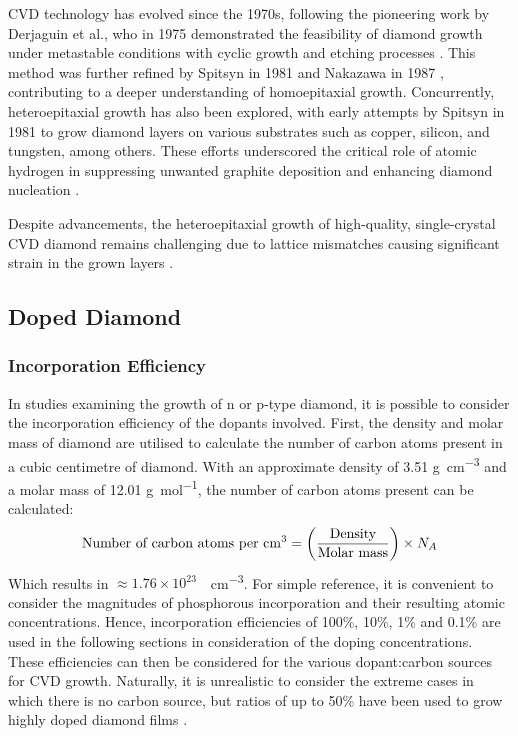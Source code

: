 \begin{refsection}
CVD technology has evolved since the 1970s, following the pioneering work by Derjaguin et al., who in 1975 demonstrated the feasibility of diamond growth under metastable conditions with cyclic growth and etching processes \cite{derjaguin:1975}. This method was further refined by Spitsyn in 1981 \cite{spitsyn:1981} and Nakazawa in 1987 \cite{nakazawa:1987}, contributing to a deeper understanding of homoepitaxial growth. Concurrently, heteroepitaxial growth has also been explored, with early attempts by Spitsyn in 1981 to grow diamond layers on various substrates such as copper, silicon, and tungsten, among others. These efforts underscored the critical role of atomic hydrogen in suppressing unwanted graphite deposition and enhancing diamond nucleation \cite{kobashi:1988}.

Despite advancements, the heteroepitaxial growth of high-quality, single-crystal CVD diamond remains challenging due to lattice mismatches causing significant strain in the grown layers \cite{Wang2022}. 

\subsection{Doped Diamond}
\subsubsection{Incorporation Efficiency}
\label{subsection:incorporation_efficiency}
In studies examining the growth of n or p-type diamond, it is possible to consider the incorporation efficiency of the dopants involved. First, the density and molar mass of diamond are utilised to calculate the number of carbon atoms present in a cubic centimetre of diamond. With an approximate density of 3.51 \si{\gram\per\centi\metre\cubed} and a molar mass of 12.01 \si{\gram\per\mole}, the number of carbon atoms present can be calculated:
\begin{equation}
    \text{Number of carbon atoms per \si{\centi\metre\cubed}} = \left(\frac{\text{Density}}{\text{Molar mass}}\right)\times N_{A}
    \label{eq:incorporation_efficiency}
\end{equation}
Which results in $\approx1.76\times10^{23}$~\si{\atoms\per\centi\metre\cubed}. For simple reference, it is convenient to consider the magnitudes of phosphorous incorporation and their resulting atomic concentrations. Hence, incorporation efficiencies of 100\%, 10\%, 1\% and 0.1\% are used in the following sections in consideration of the doping concentrations. These efficiencies can then be considered for the various dopant:carbon sources for CVD growth. Naturally, it is unrealistic to consider the extreme cases in which there is no carbon source, but ratios of up to 50\% have been used to grow highly doped diamond films \cite{kato2009, grotjohn2014}. 


\end{refsection}
